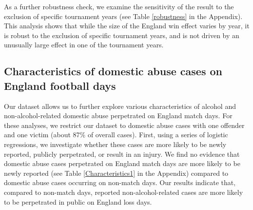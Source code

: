 \documentclass[12pt, a4paper]{article}
\begin{document}
  As a further robustness check, we examine the sensitivity of the result to the exclusion of specific tournament years  (see Table \ref{robustness} in the Appendix). This analysis shows that while the size of the England win effect varies by year, it is robust to the exclusion of specific tournament years, and is not driven by an unusually large effect in one of the tournament years.


\subsection{Characteristics of domestic abuse cases on England football days} \label{lastsection}

Our dataset allows us to further explore various characteristics of alcohol and non-alcohol-related domestic abuse perpetrated on England match days. For these analyses, we restrict our dataset to domestic abuse cases with one offender and one victim (about 87\% of overall cases). First, using a series of logistic regressions, we investigate whether these cases are more likely to be newly reported, publicly perpetrated, or result in an injury. We find no evidence that domestic abuse cases perpetrated on England match days are more likely to be newly reported (see Table \ref{Characteristics1} in the Appendix) compared to domestic abuse cases occurring on non-match days. Our results indicate that, compared to non-match days, reported non-alcohol-related cases are more likely to be perpetrated in public on England loss days.





\end{document}
